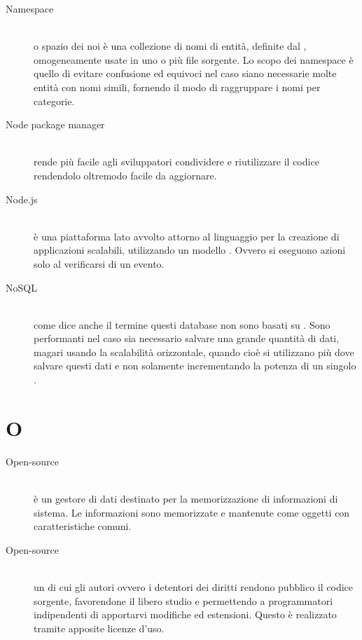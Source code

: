 \documentclass[12pt,a4paper]{article}
\begin{document}
\begin{description}

\item[Namespace] 
\hfill\\ o spazio dei noi è una collezione di nomi di entità, definite dal , omogeneamente usate in uno o più file sorgente. Lo scopo dei namespace è quello di evitare confusione ed equivoci nel caso siano necessarie molte entità con nomi simili, fornendo il modo di raggruppare i nomi per categorie.

\item[Node package manager] 
\hfill\\ rende più facile agli sviluppatori  condividere e riutilizzare il codice rendendolo oltremodo facile da aggiornare.

\item[Node.js] 
\hfill\\ è una piattaforma lato  avvolto attorno al linguaggio  per la creazione di applicazioni scalabili, utilizzando un modello . Ovvero si eseguono azioni solo al verificarsi di un evento.

\item[NoSQL] 
\hfill\\ come dice anche il termine questi database non sono basati su . Sono performanti nel caso sia necessario salvare una grande quantità di dati, magari usando la scalabilità orizzontale, quando cioè si utilizzano più  dove salvare questi dati e non solamente incrementando la potenza di un singolo .
\end{description}

\newpage

\section{O}

\begin{description}

\item[Open-source] 
\hfill\\è un gestore di dati destinato per la memorizzazione di informazioni di sistema. Le informazioni sono memorizzate e mantenute come oggetti con caratteristiche comuni.

\item[Open-source] 
\hfill\\ un  di cui gli autori ovvero i detentori dei diritti rendono pubblico il codice sorgente, favorendone il libero studio e permettendo a programmatori indipendenti di apportarvi modifiche ed estensioni. Questo è realizzato tramite apposite licenze d'uso.
\end{description}
\end{document}
